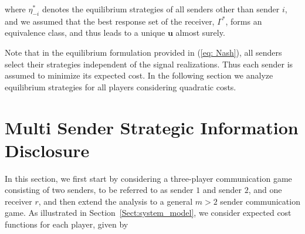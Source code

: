 \documentclass[12pt,journal,onecolumn]{IEEEtran}
\newcommand{\rknote}[1]{\noindent{\leavevmode\color{red}[Raj -- #1]}}
\begin{document}
where $\eta_{-i}^*$ denotes the equilibrium strategies of all senders other than sender $i$, and we assumed that the best response set of the receiver, $\Gamma^*$, forms an equivalence class, and thus leads to a unique $\boldsymbol{u}$ almost surely.

Note that in the equilibrium formulation provided in (\ref{eq: Nash}), all senders select their strategies independent of the signal realizations. Thus each sender is assumed to minimize its expected cost. In the following section we analyze equilibrium strategies for all players considering quadratic costs.
\section{Multi Sender Strategic Information Disclosure}\label{Sect:Strategic_com}
In this section, we first start by considering a three-player communication game consisting of two senders, to be referred to as sender $1$ and sender $2$, and one receiver $r$, and then extend the analysis to a general $m>2$ sender communication game. As illustrated in Section~\ref{Sect:system_model}, we consider expected cost functions for each player, given by
\end{document}
